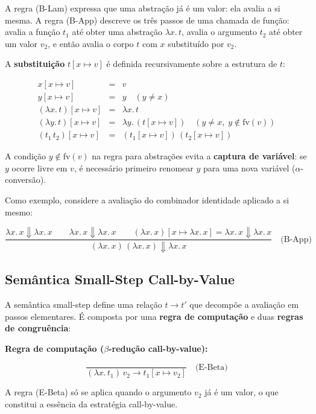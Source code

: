 A regra (B-Lam) expressa que uma abstração já é um valor: ela avalia
a si mesma. A regra (B-App) descreve os três passos de uma chamada de
função: avalia a função \(t_1\) até obter uma abstração \(\lambda
x.\, t\), avalia o argumento \(t_2\) até obter um valor \(v_2\), e
então avalia o corpo \(t\) com \(x\) substituído por \(v_2\).

A \textbf{substituição} \(t[x \mapsto v]\) é definida recursivamente
sobre a estrutura de \(t\):

\[
  \begin{array}{rcl}
    x[x \mapsto v] & = & v \\
    y[x \mapsto v] & = & y \quad (y \neq x) \\
    (\lambda x.\, t)[x \mapsto v] & = & \lambda x.\, t \\
    (\lambda y.\, t)[x \mapsto v] & = & \lambda y.\, (t[x \mapsto v]) \quad (y
    \neq x,\; y \notin \mathrm{fv}(v)) \\
    (t_1\, t_2)[x \mapsto v] & = & (t_1[x
    \mapsto v])\,(t_2[x \mapsto v])
\end{array} \]

A condição \(y \notin \mathrm{fv}(v)\) na regra para abstrações evita
a \textbf{captura de variável}: se \(y\) ocorre livre em \(v\), é
necessário primeiro renomear \(y\) para uma nova variável
(\(\alpha\)-conversão).

Como exemplo, considere a avaliação do combinador identidade aplicado
a si mesmo:

\[ \dfrac{ \lambda x.\, x \Downarrow \lambda x.\, x \qquad \lambda x.\, x
    \Downarrow \lambda x.\, x \qquad (\lambda x.\, x)[x \mapsto
    \lambda x.\, x] =
  \lambda x.\, x \Downarrow \lambda x.\, x }{ (\lambda x.\, x)\,(\lambda x.\,
x) \Downarrow \lambda x.\, x } \quad\text{(B-App)} \]

\subsection{Semântica Small-Step Call-by-Value}

A semântica small-step define uma relação \(t \to t'\) que decompõe a
avaliação em passos elementares. É composta por uma \textbf{regra de
computação} e duas \textbf{regras de congruência}:

\textbf{Regra de computação (\(\beta\)-redução call-by-value):}

\[ \dfrac{}{(\lambda x.\, t_1)\, v_2 \to t_1[x \mapsto v_2]}
\quad\text{(E-Beta)} \]

A regra (E-Beta) só se aplica quando o argumento \(v_2\) já é um
valor, o que constitui a essência da estratégia call-by-value.

